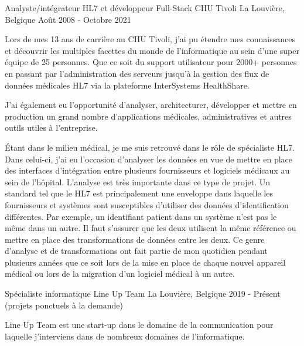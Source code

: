 

\begin{cventries}

  \cventry
    {Analyste/intégrateur HL7 et développeur Full-Stack} %
    {CHU Tivoli} %
    {La Louvière, Belgique} %
    {Août 2008 - Octobre 2021} %
    {
    Lors de mes 13 ans de carrière au CHU Tivoli, j'ai pu étendre mes connaissances et découvrir les multiples facettes du monde de l'informatique au sein d'une super équipe de 25 personnes.
    Que ce soit du support utilisateur pour 2000+ personnes en passant par l'administration des serveurs jusqu'à la gestion des flux de données médicales HL7 via la plateforme InterSystems HealthShare.
    
    J'ai également eu l'opportunité d'analyser, architecturer, développer et mettre en production un grand nombre d'applications médicales, administratives et autres outils utiles à l'entreprise.
    
    Étant dans le milieu médical, je me suis retrouvé dans le rôle de spécialiste HL7. Dans celui-ci, j'ai eu l'occasion d'analyser les données en vue de mettre en place des interfaces d'intégration entre plusieurs fournisseurs et logiciels médicaux au sein de l'hôpital.
    L'analyse est très importante dans ce type de projet.
    Un standard tel que le HL7 est principalement une enveloppe dans laquelle les fournisseurs et systèmes sont susceptibles d'utiliser des données d'identification différentes. Par exemple, un identifiant patient dans un système n'est pas le même dans un autre. Il faut s'assurer que les deux utilisent la même référence ou mettre en place des transformations de données entre les deux. Ce genre d'analyse et de transformations ont fait partie de mon quotidien pendant plusieurs années que ce soit lors de la mise en place de chaque nouvel appareil médical ou lors de la migration d'un logiciel médical à un autre.
    
    }

  \cventry
    {Spécialiste informatique} %
    {Line Up Team} %
    {La Louvière, Belgique} %
    {2019 - Présent (projets ponctuels à la demande)} %
    {
    Line Up Team est une start-up dans le domaine de la communication pour laquelle j'interviens dans de nombreux domaines de l'informatique.
    
}
\end{cventries}
